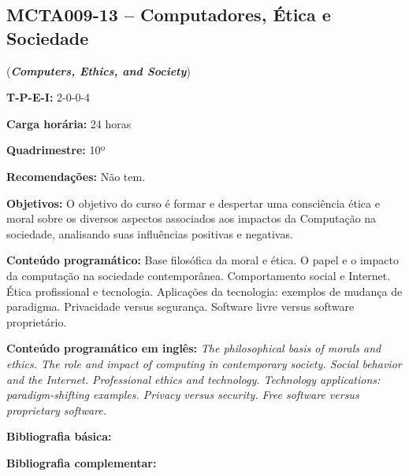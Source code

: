 \documentclass[class=article, crop=false]{standalone}
\begin{document}
\subsection*{MCTA009-13 -- Computadores, Ética e Sociedade}
\label{disc:ces}

(\textbf{\textit{Computers, Ethics, and Society}})

\begin{center}
    \begin{minipage}{0.85\textwidth}
        \textbf{T-P-E-I:} 2-0-0-4
        
        \textbf{Carga horária:} 24 horas
        
        \textbf{Quadrimestre:} 10º
        
        \textbf{Recomendações:} Não tem.
    \end{minipage}
\end{center}

\textbf{Objetivos:}
O objetivo do curso é formar e despertar uma consciência ética e moral sobre os
diversos aspectos associados aos impactos da Computação na sociedade,
analisando suas influências positivas e negativas.

\textbf{Conteúdo programático:}
Base filosófica da moral e ética.
O papel e o impacto da computação na sociedade contemporânea.
Comportamento social e Internet.
Ética profissional e tecnologia.
Aplicações da tecnologia: exemplos de mudança de paradigma.
Privacidade versus segurança.
Software livre versus software proprietário.

\textbf{Conteúdo programático em inglês:}
\textit{The philosophical basis of morals and ethics.
The role and impact of computing in contemporary society. 
Social behavior and the Internet. 
Professional ethics and technology. 
Technology applications: paradigm-shifting examples. 
Privacy versus security. 
Free software versus proprietary software.}

\newrefsection
\textbf{Bibliografia básica:}
\nocite{2017-vazquez, 2020-maciel-viterboa, 2020-maciel-viterbob,2020-maciel-viterboc} 
\printbibliography

\newrefsection
\textbf{Bibliografia complementar:}
\nocite{2011-dupas, 2008-masiero, 2004-lessig, 2010-levy}
\printbibliography
\end{document}
